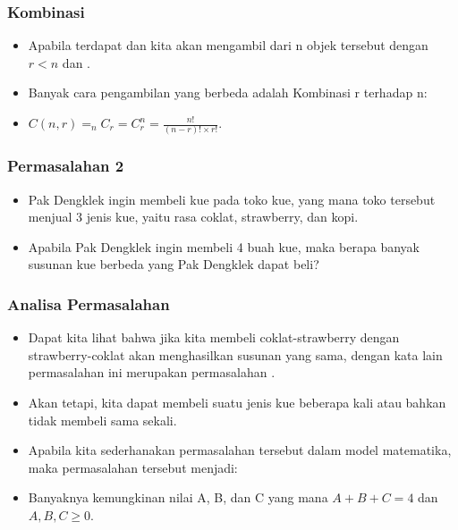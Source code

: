 \begin{frame}
\frametitle{Kombinasi}
\begin{itemize}
  \item Apabila terdapat  dan kita akan mengambil  dari n objek tersebut dengan $r<n$ dan .
  \item Banyak cara pengambilan yang berbeda adalah Kombinasi r terhadap n: 
  \item $C(n,r) = _{n}C_{r} = C^{n}_{r} = \frac{n!}{(n-r)! \times r!}$.
\end{itemize}
\end{frame}

\begin{frame}
\frametitle{Permasalahan 2}
\begin{itemize}
  \item Pak Dengklek ingin membeli kue pada toko kue, yang mana toko tersebut menjual 3 jenis kue, yaitu rasa coklat, strawberry, dan kopi.
  \item Apabila Pak Dengklek ingin membeli 4 buah kue, maka berapa banyak susunan kue berbeda yang Pak Dengklek dapat beli?
\end{itemize}
\end{frame}

\begin{frame}
\frametitle{Analisa Permasalahan}
\begin{itemize}
  \item Dapat kita lihat bahwa jika kita membeli coklat-strawberry dengan strawberry-coklat akan menghasilkan susunan yang sama, dengan kata lain permasalahan ini merupakan permasalahan .
  \item Akan tetapi, kita dapat membeli suatu jenis kue beberapa kali atau bahkan tidak membeli sama sekali.
  \item Apabila kita sederhanakan permasalahan tersebut dalam model matematika, maka permasalahan tersebut menjadi:
  \item Banyaknya kemungkinan nilai A, B, dan C yang mana $A + B + C = 4$ dan $A,B,C \geq 0$.
\end{itemize}
\end{frame}

